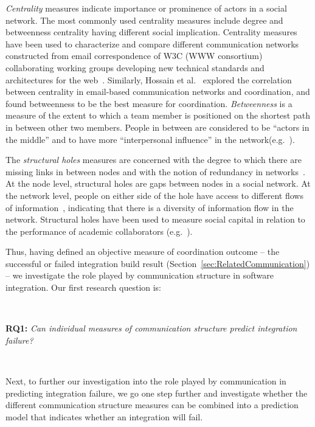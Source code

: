 \emph{Centrality} measures indicate importance or prominence of actors in a
social network. The most commonly used centrality measures include degree and
betweenness centrality having different social implication. Centrality measures
have been used to characterize and compare different communication networks
constructed from email correspondence of W3C (WWW consortium) collaborating
working groups developing new technical standards and architectures for the
web~\cite{Gloor:2003cikm}. Similarly, Hossain et al.~\cite{hossain:cscw:2006}
explored the correlation between centrality in email-based communication networks
and coordination, and found betweenness to be the best measure for coordination.
\emph{Betweenness} is a measure of the extent to which a team member is
positioned on the shortest path in between other two members. People in between
are considered to be ``actors in the middle'' and to have more ``interpersonal
influence'' in the
network(e.g.~\cite{Gloor:2003cikm,zimmermann:icse:2008,hossain:cscw:2006}).

The \emph{structural holes} measures are concerned with the degree to which there
are missing links in between nodes and with the notion of redundancy in
networks~\cite{Burt:1995vo}. At the node level, structural holes are gaps between
nodes in a social network. At the network level, people on either side of the
hole have access to different flows of information~\cite{Hargadon:1997asq},
indicating that there is a diversity of information flow in the network.
Structural holes have been used to measure social capital in relation to the
performance of academic collaborators (e.g.~\cite{Brambila:PICMET2007}).


Thus, having defined an objective measure of coordination outcome -- the
successful or failed integration build result
(Section~\ref{sec:RelatedCommunication}) -- we investigate the role played by
communication structure in software integration. Our first research question is:

\ \

\noindent\textbf{RQ1:} \emph{Can individual measures of communication structure
predict integration failure?}

\ \

Next, to further our investigation into the role played by communication in
predicting integration failure, we go one step further and investigate whether
the different communication structure measures can be combined into a prediction
model that indicates whether an integration will fail.

